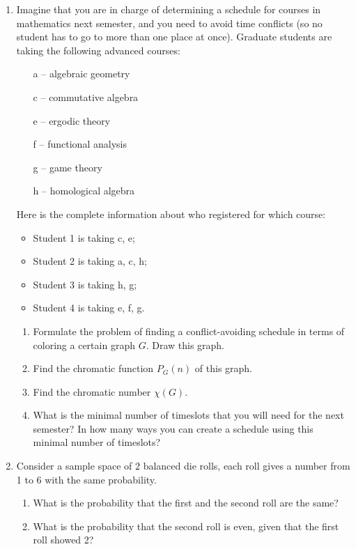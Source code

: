 \documentclass[12pt]{amsart}
\begin{document}
\begin{enumerate}[label=\arabic*.,itemsep=10pt, leftmargin=*]
    \item
    Imagine that you are in charge of determining a schedule for courses in mathematics next semester, and you need to avoid time conflicts (so no student has to go to more than one place at once). Graduate students are taking the following advanced courses:
    \begin{itemize}
        \item[a --] algebraic geometry
        \item[c --] commutative algebra
        \item[e --] ergodic theory
        \item[f --] functional analysis
        \item[g --] game theory
        \item[h --] homological algebra
    \end{itemize}
    Here is the complete information about who registered for which course:
    \begin{itemize}
        \item Student 1 is taking
        c, e;
        \item Student 2 is taking
        a, c, h;
        \item Student 3 is taking
        h, g;
        \item Student 4 is taking e, f, g.
    \end{itemize}
    \begin{enumerate}
    \item Formulate the problem of finding a conflict-avoiding schedule in terms of coloring a certain graph $G$. Draw this graph.
    \item Find the chromatic function $P_G(n)$ of this graph.
    \item Find the chromatic number $\chi(G)$.
    \item What is the minimal number of timeslots that you will need for the next semester? In how many ways you can create a schedule using this minimal number of timeslots?
    \end{enumerate}
    \item 
        Consider a sample space of $2$ balanced die rolls, each roll gives a number from 1 to 6 with the same probability.
        \begin{enumerate}
            \item What is the probability that the first and the second roll are the same?
            \item What is the probability that the second roll is even, given that the
            first roll showed 2?
        \end{enumerate}



\end{enumerate}
\end{document}
